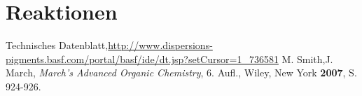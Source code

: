 \documentclass[12pt]{beamer}
\begin{document}
\section{Reaktionen}
%

\begin{frame}
\begin{thebibliography}{}

Technisches Datenblatt,\url{http://www.dispersions-pigments.basf.com/portal/basf/ide/dt.jsp?setCursor=1_736581}
M. Smith,J. March, \textit{March's Advanced Organic Chemistry}, 6. Aufl., Wiley, New York \textbf{2007}, S. 924-926.
\end{thebibliography}
\end{frame}


%


\end{document}
